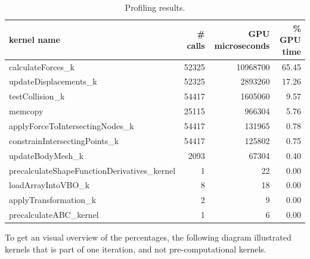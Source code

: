 
\begin{table}
  \centering
  \begin{tabular}{| l | r | r | r |}
    \hline
    kernel name & \# calls & GPU microseconds & \% GPU time \\
    \hline
calculateForces\_k                 & 52325 & 10968700 & 65.45 \\
updateDisplacements\_k             & 52325 &  2893260 & 17.26 \\
testCollision\_k                   & 54417 &  1605060 &  9.57 \\
memcopy                                       & 25115 &      966304 &  5.76 \\
applyForceToIntersectingNodes\_k              & 54417 &      131965 &  0.78 \\
constrainIntersectingPoints\_k                & 54417 &      125802 &  0.75 \\
updateBodyMesh\_k                             &  2093 &       67304 &  0.40 \\
precalculateShapeFunctionDerivatives\_kernel  &     1 &      22 &  0.00 \\
loadArrayIntoVBO\_k                           &     8 &      18 &  0.00 \\
applyTransformation\_k                        &     2 &       9 &  0.00 \\
precalculateABC\_kernel                       &     1 &       6 &  0.00 \\
    \hline
  \end{tabular}
  \caption{Profiling results.}
  \label{table:cuda-progiler-data}
\end{table}

To get an visual overview of the percentages, the following diagram
illustrated kernels that is part of one iteration, and not
pre-computational kernels.

